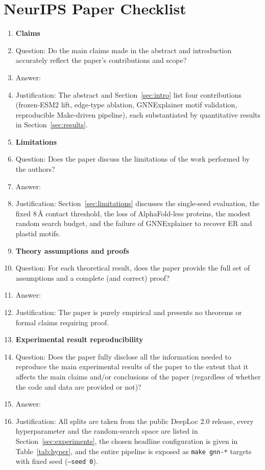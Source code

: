 \section*{NeurIPS Paper Checklist}

\begin{enumerate}

\item {\bf Claims}
    \item[] Question: Do the main claims made in the abstract and introduction accurately reflect the paper's contributions and scope?
    \item[] Answer: \answerYes{}
    \item[] Justification: The abstract and Section~\ref{sec:intro} list four contributions
    (frozen-ESM2 lift, edge-type ablation, GNNExplainer motif validation,
    reproducible Make-driven pipeline), each substantiated by quantitative
    results in Section~\ref{sec:results}.

\item {\bf Limitations}
    \item[] Question: Does the paper discuss the limitations of the work performed by the authors?
    \item[] Answer: \answerYes{}
    \item[] Justification: Section~\ref{sec:limitations} discusses the single-seed
    evaluation, the fixed 8\,\AA{} contact threshold, the loss of
    AlphaFold-less proteins, the modest random search budget, and the failure
    of GNNExplainer to recover ER and plastid motifs.

\item {\bf Theory assumptions and proofs}
    \item[] Question: For each theoretical result, does the paper provide the full set of assumptions and a complete (and correct) proof?
    \item[] Answer: \answerNA{}
    \item[] Justification: The paper is purely empirical and presents no theorems
    or formal claims requiring proof.

\item {\bf Experimental result reproducibility}
    \item[] Question: Does the paper fully disclose all the information needed to reproduce the main experimental results of the paper to the extent that it affects the main claims and/or conclusions of the paper (regardless of whether the code and data are provided or not)?
    \item[] Answer: \answerYes{}
    \item[] Justification: All splits are taken from the public DeepLoc 2.0 release,
    every hyperparameter and the random-search space are listed in
    Section~\ref{sec:experiments}, the chosen headline configuration is given
    in Table~\ref{tab:hyper}, and the entire pipeline is exposed as
    \texttt{make gnn-*} targets with fixed seed (\texttt{--seed 0}).


\end{enumerate}
